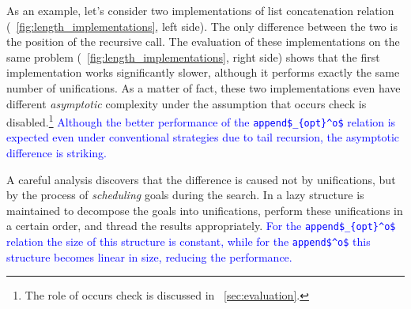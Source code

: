 As an example, let's consider two implementations of list concatenation relation (\figureword~\ref{fig:length_implementations}, left side). The only difference between the two is
the position of the recursive call.
The evaluation of these implementations on the same problem (\figureword~\ref{fig:length_implementations}, right side) shows that the first implementation works significantly
slower,
although it performs exactly the same number of unifications. As a matter of fact, these two implementations even have different \emph{asymptotic} complexity under the assumption
that occurs check is disabled.\footnote{The role of occurs check is discussed in
\sectionword~\ref{sec:evaluation}.} \textcolor{blue}{Although the better performance of the \lstinline|append$_{opt}^o$| relation is expected even under conventional strategies due to tail recursion, the asymptotic difference is striking.}

A careful analysis discovers that the difference is caused not by unifications, but by the process of \emph{scheduling} goals during the search. In \mK a
lazy structure is maintained to decompose the goals into unifications, perform these unifications in a certain order, and thread the results appropriately. \textcolor{blue}{For the \lstinline|append$_{opt}^o$| relation the size of this structure is constant, while for the \lstinline|append$^o$|
this structure becomes linear in size, reducing the performance.}


